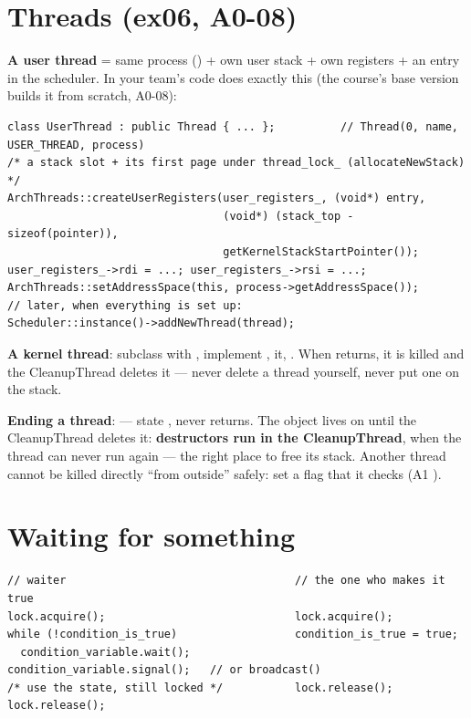 \section{Threads (ex06, A0-08)}
\label{sec:threads}

\textbf{A user thread} = same process () + own user stack + own registers +
an entry in the scheduler. In your team's code  does exactly this
(the course's base version builds it from scratch, A0-08):

\begin{lstlisting}[style=cpp]
class UserThread : public Thread { ... };          // Thread(0, name, USER_THREAD, process)
/* a stack slot + its first page under thread_lock_ (allocateNewStack) */
ArchThreads::createUserRegisters(user_registers_, (void*) entry,
                                 (void*) (stack_top - sizeof(pointer)),
                                 getKernelStackStartPointer());
user_registers_->rdi = ...; user_registers_->rsi = ...;
ArchThreads::setAddressSpace(this, process->getAddressSpace());
// later, when everything is set up:
Scheduler::instance()->addNewThread(thread);
\end{lstlisting}

\textbf{A kernel thread}: subclass  with , implement
,  it, . When  returns, it is killed
and the CleanupThread deletes it --- never delete a thread yourself, never put one on
the stack.

\textbf{Ending a thread}:  --- state , never
returns. The object lives on until the CleanupThread deletes it: \textbf{destructors run in
the CleanupThread}, when the thread can never run again --- the right place to free its
stack. Another thread cannot be killed directly ``from outside'' safely: set a flag that it
checks (A1 ).

\section{Waiting for something}
\label{sec:waiting}

\begin{lstlisting}[style=cpp]
// waiter                                   // the one who makes it true
lock.acquire();                             lock.acquire();
while (!condition_is_true)                  condition_is_true = true;
  condition_variable.wait();                condition_variable.signal();   // or broadcast()
/* use the state, still locked */           lock.release();
lock.release();
\end{lstlisting}

